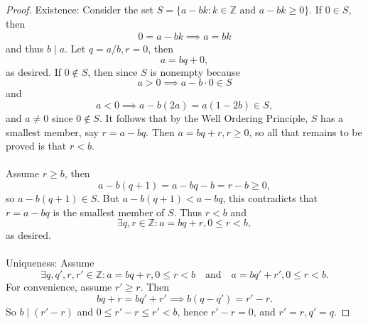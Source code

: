\documentclass{article}
\newtheorem{theorem}{Theorem}[section]
\theoremstyle{definition}
\begin{document}
\noindent{}
\begin{proof}
    Existence: Consider the set $S = \{a-bk: k \in \mathbb{Z} \text{ and } a-bk \geq 0\}$. If $0 \in S$, then
    \begin{align*}
        0 = a-bk \implies a = bk
    \end{align*}
    and thus $b \mid a$. Let $q=a/b,r=0$, then 
    \begin{equation*}
        a = bq + 0,
    \end{equation*}
    as desired. If $0 \notin S$, then since $S$ is nonempty because
    \begin{equation*}
        a>0 \implies a-b \cdot 0 \in S
    \end{equation*}
    and
    \begin{equation*}
        a<0 \implies a-b(2a) = a(1-2b) \in S,
    \end{equation*}
    and $a \neq 0$ since $0 \notin S$. It follows that by the Well Ordering Principle, $S$ has a smallest member, say $r=a-bq$. Then $a=bq+r, r \geq 0$, so all that remains to be proved is that $r < b$.
    \\ \\
    Assume $r \geq b$, then
    \begin{equation*}
        a-b(q+1) = a-bq-b = r-b \geq 0,
    \end{equation*}
    so $a-b(q+1) \in S$. But $a-b(q+1) < a-bq$, this contradicts that $r=a-bq$ is the smallest member of $S$. Thus $r<b$ and 
    \begin{equation*}
        \exists q,r \in \mathbb{Z}: a = bq + r, 0 \leq r < b,
    \end{equation*}
    as desired.
    \\ \\
    Uniqueness: Assume 
    \begin{equation*}
        \exists q,q',r,r' \in \mathbb{Z}: a=bq+r,0 \leq r <b \quad \text{and} \quad a = bq'+r', 0 \leq r < b.
    \end{equation*}
    For convenience, assume $r' \geq r$. Then
    \begin{equation*}
        bq+r = bq'+r' \implies b(q-q') = r'-r.
    \end{equation*}
    So $b \mid (r'-r)$ and $0 \leq r'-r \leq r' < b$, hence $r'-r=0$, and $r'=r,q'=q$.
\end{proof}
\end{document}

